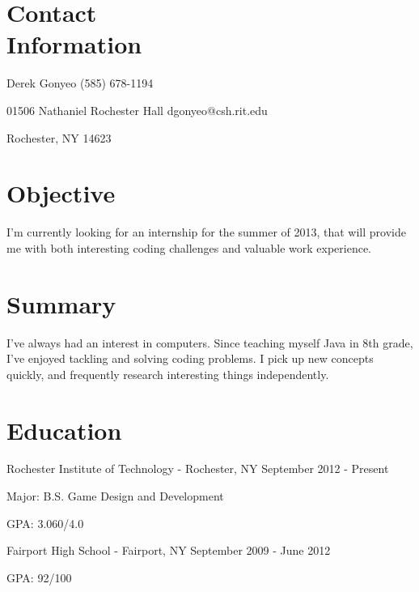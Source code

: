 \documentclass[a4paper,margin,line]{resume}
\newcommand{\rdate}[1]{\hfill {\small #1}}
\begin{document}
\begin{resume}
\section{\mysidestyle Contact \\ Information} \vspace{2mm}
	\begin{asparablank}
		\item Derek Gonyeo \hfill (585) 678-1194
		\item 01506 Nathaniel Rochester Hall \hfill dgonyeo@csh.rit.edu
		\item Rochester, NY 14623
	\end{asparablank}

\section{\mysidestyle Objective}
	I'm currently looking for an internship for the summer of 2013, that will provide me with both interesting coding challenges and valuable work experience.

\section{\mysidestyle Summary}
        I've always had an interest in computers. Since teaching myself Java in 8th grade, I've enjoyed tackling and solving coding problems. I pick up new concepts quickly, and frequently research interesting things independently.

\section{\mysidestyle Education}
	\begin{compactdesc}
		\item[Rochester Institute of Technology] - Rochester, NY \rdate{September 2012 - Present}
		\begin{compactitem} { \small
			\item Major: B.S. Game Design and Development
			\item GPA: 3.060/4.0
		} \end{compactitem}
                \item[Fairport High School] - Fairport, NY \rdate{September 2009 - June 2012}
                \begin{compactitem} {\small
                        \item GPA: 92/100
                } \end{compactitem}
	\end{compactdesc}


\end{resume}
\end{document}

